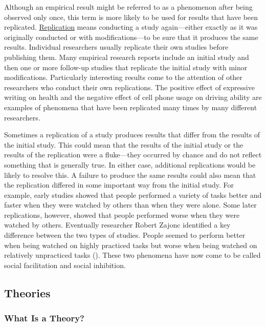 \documentclass[
]{krantz}
\begin{document}
Although an empirical result might be referred to as a phenomenon after being observed only once, this term is more likely to be used for results that have been replicated. \hyperref[replication]{Replication} means conducting a study again---either exactly as it was originally conducted or with modifications---to be sure that it produces the same results. Individual researchers usually replicate their own studies before publishing them. Many empirical research reports include an initial study and then one or more follow-up studies that replicate the initial study with minor modifications. Particularly interesting results come to the attention of other researchers who conduct their own replications. The positive effect of expressive writing on health and the negative effect of cell phone usage on driving ability are examples of phenomena that have been replicated many times by many different researchers.

Sometimes a replication of a study produces results that differ from the results of the initial study. This could mean that the results of the initial study or the results of the replication were a fluke---they occurred by chance and do not reflect something that is generally true. In either case, additional replications would be likely to resolve this. A failure to produce the same results could also mean that the replication differed in some important way from the initial study. For example, early studies showed that people performed a variety of tasks better and faster when they were watched by others than when they were alone. Some later replications, however, showed that people performed worse when they were watched by others. Eventually researcher Robert Zajonc identified a key difference between the two types of studies. People seemed to perform better when being watched on highly practiced tasks but worse when being watched on relatively unpracticed tasks (). These two phenomena have now come to be called social facilitation and social inhibition.

\subsection*{Theories}\label{theories}


\subsubsection*{What Is a Theory?}\label{what-is-a-theory}
\end{document}
